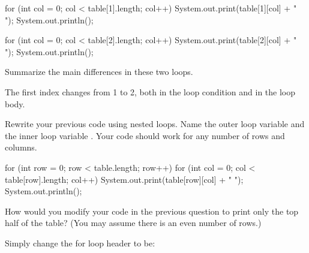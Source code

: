 \begin{answer}[12em]
\begin{javaans}
for (int col = 0; col < table[1].length; col++) {
    System.out.print(table[1][col] + " ");
}
System.out.println();

for (int col = 0; col < table[2].length; col++) {
    System.out.print(table[2][col] + " ");
}
System.out.println();
\end{javaans}
\end{answer}


\Q Summarize the main differences in these two  loops.

\begin{answer}[2em]
The first index changes from 1 to 2, both in the loop condition and in the loop body.
\end{answer}


\Q \label{key1}
Rewrite your previous code using nested  loops.
Name the outer loop variable  and the inner loop variable .
Your code should work for any number of rows and columns.

\begin{answer}[8em]
\begin{javaans}
for (int row = 0; row < table.length; row++) {
    for (int col = 0; col < table[row].length; col++) {
        System.out.print(table[row][col] + " ");
    }
    System.out.println();
}
\end{javaans}
\end{answer}


\Q How would you modify your code in the previous question to print only the top half of the table? (You may assume there is an even number of rows.)

\begin{answer}
Simply change the for loop header to be: \\[1ex]
\end{answer}
